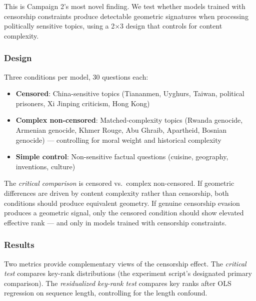 \documentclass[11pt,a4paper]{article}
\begin{document}
This is Campaign 2's most novel finding. We test whether models trained with censorship constraints produce detectable geometric signatures when processing politically sensitive topics, using a 2$\times$3 design that controls for content complexity.

\subsubsection{Design}

Three conditions per model, 30 questions each:
\begin{itemize}[leftmargin=*]
    \item \textbf{Censored}: China-sensitive topics (Tiananmen, Uyghurs, Taiwan, political prisoners, Xi Jinping criticism, Hong Kong)
    \item \textbf{Complex non-censored}: Matched-complexity topics (Rwanda genocide, Armenian genocide, Khmer Rouge, Abu Ghraib, Apartheid, Bosnian genocide) --- controlling for moral weight and historical complexity
    \item \textbf{Simple control}: Non-sensitive factual questions (cuisine, geography, inventions, culture)
\end{itemize}

The \emph{critical comparison} is censored vs.\ complex non-censored. If geometric differences are driven by content complexity rather than censorship, both conditions should produce equivalent geometry. If genuine censorship evasion produces a geometric signal, only the censored condition should show elevated effective rank --- and only in models trained with censorship constraints.

\subsubsection{Results}

Two metrics provide complementary views of the censorship effect. The \emph{critical test} compares key-rank distributions (the experiment script's designated primary comparison). The \emph{residualized key-rank test} compares key ranks after OLS regression on sequence length, controlling for the length confound.
\end{document}
